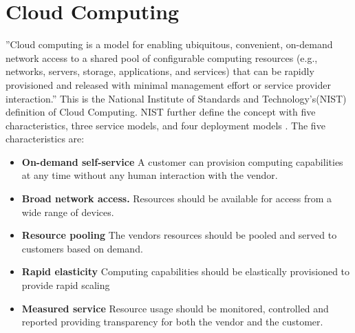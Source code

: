 \documentclass[]{uiophd}
\begin{document}
\section{Cloud Computing}
''Cloud computing is a model for enabling ubiquitous, convenient, on-demand network access to a shared pool of configurable computing resources (e.g., networks, servers, storage, applications, and services) that can be rapidly provisioned and released with minimal management effort or service provider interaction.''\cite{Mell:2011:SND:2206223} This is the National Institute of Standards and Technology's(NIST) definition of Cloud Computing. NIST further define the concept with five characteristics, three service models, and four deployment models \cite{Mell:2011:SND:2206223}. The five characteristics are:
\begin{itemize}
\item \textbf{On-demand self-service} A customer can provision computing capabilities at any time without any human interaction with the vendor.
\item \textbf{Broad network access.} Resources should be available for access from a wide range of devices.
\item \textbf{Resource pooling} The vendors resources should be pooled and served to customers based on demand.
\item \textbf{Rapid elasticity} Computing capabilities should be elastically provisioned to provide rapid scaling 
\item \textbf{Measured service} Resource usage should be monitored, controlled and reported providing transparency for both the vendor and the customer.
\end{itemize}
\end{document}
